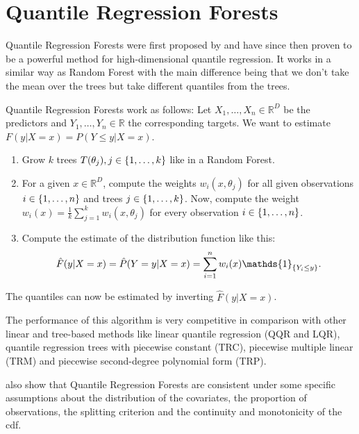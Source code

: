 \section{Quantile Regression Forests}
\label{sec:qrf}

Quantile Regression Forests were first proposed by \Textcite{Meinshausen2006}
and have since then proven to be a powerful method for high-dimensional quantile 
regression. It works in a similar way as Random Forest with the main difference 
being that we don't take the mean over the trees but take different quantiles 
from the trees.

Quantile Regression Forests work as follows:
Let \(X_1, \ldots, X_n \in \mathbb{R}^D\) be the predictors and 
\(Y_1, \ldots, Y_n \in \mathbb{R}\) the corresponding targets.
We want to estimate \(F(y|X=x) = P(Y\leq y| X = x)\).
\begin{enumerate}
    \item Grow \(k\) trees \(T(\theta_j), j\in\{1,\ldots,k\}\) like in a Random Forest.
    \item For a given \(x \in \mathbb{R}^D\), compute the weights \(w_i(x, \theta_j)\) 
    for all given observations \(i \in \{1,\ldots, n\}\) and trees \(j \in \{1, \ldots, k\}\).
    Now, compute the weight \(w_i(x) = \frac{1}{k} \sum_{j=1}^k w_i(x, \theta_j)\) for every 
    observation \(i \in \{1,\ldots, n\}\).
    \item Compute the estimate of the distribution function like this:
    \[ \hat{F}(y | X=x) = \hat{P}(Y=y | X=x) = \sum_{i=1}^n w_i(x) \mathds{1}_{\set{Y_i \leq y}}. \]
\end{enumerate}
The quantiles can now be estimated by inverting \(\hat{F}(y|X=x)\).

The performance of this algorithm is very competitive in comparison with other 
linear and tree-based methods like linear quantile regression (QQR and LQR), quantile regression trees with 
piecewise constant (TRC), piecewise multiple linear (TRM) and piecewise second-degree polynomial form (TRP).

\Textcite{Meinshausen2006} also show that Quantile Regression Forests are consistent 
under some specific assumptions about the distribution of the covariates, the proportion of observations, the splitting criterion and the 
continuity and monotonicity of the \gls{cdf}.